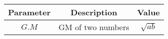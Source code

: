 \begin{tabular}{|c|c|c|}
        \hline
        \textbf{Parameter} & \textbf{Description}&\textbf{Value}\\
        \hline
        $G.M$ & GM of two numbers&$\sqrt{ab}$  \\
         \hline
    \end{tabular}
